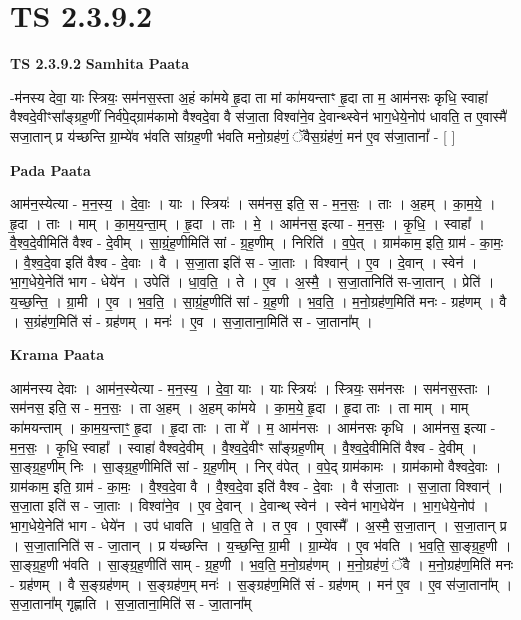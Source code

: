 \documentclass[17pt]{extarticle}
\begin{document}
\section*{ TS 2.3.9.2 }

\textbf{TS 2.3.9.2 } \newline
\textbf{Samhita Paata} \newline

-म॑नस्य देवा॒ याः स्त्रियः॒ सम॑नस॒स्ता अ॒हं का॑मये हृ॒दा ता मां का॑मयन्ताꣳ हृ॒दा ता म॒ आम॑नसः कृधि॒ स्वाहा॑ वैश्वदे॒वीꣳसा᳚ङ्ग्रह॒णीं निर्व॑पे॒द्ग्राम॑कामो वैश्वदे॒वा वै स॑जा॒ता विश्वा॑ने॒व दे॒वान्थ्स्वेन॑ भाग॒धेये॒नोप॑ धावति॒ त ए॒वास्मै॑ सजा॒तान् प्र य॑च्छन्ति ग्रा॒म्ये॑व भ॑वति सांग्रह॒णी भ॑वति मनो॒ग्रह॑णं॒ ॅवैस॒ग्रंह॑णं॒ मन॑ ए॒व स॑जा॒तानां᳚ - [  ] \newline

\textbf{Pada Paata} \newline

आम॑न॒स्येत्या - म॒न॒स्य॒ । दे॒वाः॒ । याः । स्त्रियः॑ । सम॑नस॒ इति॒ स - म॒न॒सः॒ । ताः । अ॒हम् । का॒म॒ये॒ । हृ॒दा । ताः । माम् । का॒म॒य॒न्ता॒म् । हृ॒दा । ताः । मे॒ । आम॑नस॒ इत्या - म॒न॒सः॒ । कृ॒धि॒ । स्वाहा᳚ । वै॒श्व॒दे॒वीमिति॑ वैश्व - दे॒वीम् । सा॒ग्रं॒ह॒णीमिति॑ सां - ग्र॒ह॒णीम् । निरिति॑ । व॒पे॒त् । ग्राम॑काम॒ इति॒ ग्राम॑ - का॒मः॒ । वै॒श्व॒दे॒वा इति॑ वैश्व - दे॒वाः । वै । स॒जा॒ता इति॑ स - जा॒ताः । विश्वान्॑ । ए॒व । दे॒वान् । स्वेन॑ । भा॒ग॒धेये॒नेति॑ भाग - धेये॑न । उपेति॑ । धा॒व॒ति॒ । ते । ए॒व । अ॒स्मै॒ । स॒जा॒तानिति॑ स-जा॒तान् । प्रेति॑ । य॒च्छ॒न्ति॒ । ग्रा॒मी ।  ए॒व । भ॒व॒ति॒ । सा॒ग्रं॒ह॒णीति॑ सां - ग्र॒ह॒णी । भ॒व॒ति॒ । म॒नो॒ग्रह॑ण॒मिति॑ मनः - ग्रह॑णम् । वै । स॒ग्रंह॑ण॒मिति॑ सं - ग्रह॑णम् । मनः॑ ।  ए॒व । स॒जा॒ताना॒मिति॑ स - जा॒ताना᳚म् ।  \newline


\textbf{Krama Paata} \newline

आम॑नस्य देवाः । आम॑न॒स्येत्या - म॒न॒स्य॒ । दे॒वा॒ याः । याः स्त्रियः॑ । स्त्रियः॒ सम॑नसः । सम॑नस॒स्ताः । सम॑नस॒ इति॒ स - म॒न॒सः॒ । ता अ॒हम् । अ॒हम् का॑मये । का॒म॒ये॒ हृ॒दा । हृ॒दा ताः । ता माम् । माम् का॑मयन्ताम् । का॒म॒य॒न्ताꣳ॒॒ हृ॒दा । हृ॒दा ताः । ता मे᳚ । म॒ आम॑नसः । आम॑नसः कृधि । आम॑नस॒ इत्या - म॒न॒सः॒ । कृ॒धि॒ स्वाहा᳚ । स्वाहा॑ वैश्वदे॒वीम् । वै॒श्व॒दे॒वीꣳ सा᳚ङ्ग्रह॒णीम् । वै॒श्व॒दे॒वीमिति॑ वैश्व - दे॒वीम् । सा॒ङ्ग्र॒ह॒णीम् निः । सा॒ङ्ग्र॒ह॒णीमिति॑ सां - ग्र॒ह॒णीम् । निर् व॑पेत् । व॒पे॒द् ग्राम॑कामः । ग्राम॑कामो वैश्वदे॒वाः । ग्राम॑काम॒ इति॒ ग्राम॑ - का॒मः॒ । वै॒श्व॒दे॒वा वै । वै॒श्व॒दे॒वा इति॑ वैश्व - दे॒वाः । वै स॑जा॒ताः । स॒जा॒ता विश्वान्॑ । स॒जा॒ता इति॑ स - जा॒ताः । विश्वा॑ने॒व । ए॒व दे॒वान् । दे॒वान्थ् स्वेन॑ । स्वेन॑ भाग॒धेये॑न । भा॒ग॒धेये॒नोप॑ । भा॒ग॒धेये॒नेति॑ भाग - धेये॑न । उप॑ धावति । धा॒व॒ति॒ ते । त ए॒व । ए॒वास्मै᳚ । अ॒स्मै॒ स॒जा॒तान् । स॒जा॒तान् प्र । स॒जा॒तानिति॑ स - जा॒तान् । प्र य॑च्छन्ति । य॒च्छ॒न्ति॒ ग्रा॒मी । ग्रा॒म्ये॑व । ए॒व भ॑वति । भ॒व॒ति॒ सा॒ङ्ग्र॒ह॒णी । सा॒ङ्ग्र॒ह॒णी भ॑वति । सा॒ङ्ग्र॒ह॒णीति॑ साम् - ग्र॒ह॒णी । भ॒व॒ति॒ म॒नो॒ग्रह॑णम् । म॒नो॒ग्रह॑णं॒ ॅवै । म॒नो॒ग्रह॑ण॒मिति॑ मनः - ग्रह॑णम् । वै स॒ङ्ग्रह॑णम् । स॒ङ्ग्रह॑ण॒म् मनः॑ । स॒ङ्ग्रह॑ण॒मिति॑ सं - ग्रह॑णम् । मन॑ ए॒व । ए॒व स॑जा॒ताना᳚म् । स॒जा॒ताना᳚म् गृह्णाति । स॒जा॒ताना॒मिति॑ स - जा॒ताना᳚म् \newline
\end{document}
